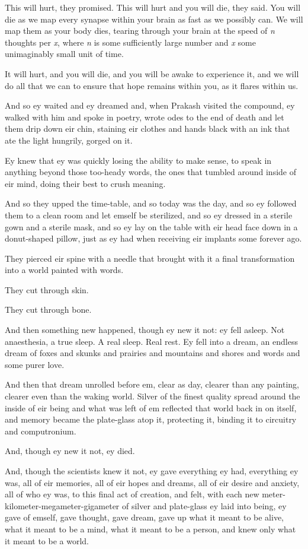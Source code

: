 This will hurt, they promised. This will hurt and you will die, they said. You will die as we map every synapse within your brain as fast as we possibly can. We will map them as your body dies, tearing through your brain at the speed of \emph{n} thoughts per \emph{x}, where \emph{n} is some sufficiently large number and \emph{x} some unimaginably small unit of time.

It will hurt, and you will die, and you will be awake to experience it, and we will do all that we can to ensure that hope remains within you, as it flares within us.

And so ey waited and ey dreamed and, when Prakash visited the compound, ey walked with him and spoke in poetry, wrote odes to the end of death and let them drip down eir chin, staining eir clothes and hands black with an ink that ate the light hungrily, gorged on it.

Ey knew that ey was quickly losing the ability to make sense, to speak in anything beyond those too-heady words, the ones that tumbled around inside of eir mind, doing their best to crush meaning.

And so they upped the time-table, and so today was the day, and so ey followed them to a clean room and let emself be sterilized, and so ey dressed in a sterile gown and a sterile mask, and so ey lay on the table with eir head face down in a donut-shaped pillow, just as ey had when receiving eir implants some forever ago.

They pierced eir spine with a needle that brought with it a final transformation into a world painted with words.

They cut through skin.

They cut through bone.

And then something new happened, though ey new it not: ey fell asleep. Not anaesthesia, a true sleep. A real sleep. Real rest. Ey fell into a dream, an endless dream of foxes and skunks and prairies and mountains and shores and words and some purer love.

And then that dream unrolled before em, clear as day, clearer than any painting, clearer even than the waking world. Silver of the finest quality spread around the inside of eir being and what was left of em reflected that world back in on itself, and memory became the plate-glass atop it, protecting it, binding it to circuitry and computronium.

And, though ey new it not, ey died.

And, though the scientists knew it not, ey gave everything ey had, everything ey was, all of eir memories, all of eir hopes and dreams, all of eir desire and anxiety, all of who ey was, to this final act of creation, and felt, with each new meter-kilometer-megameter-gigameter of silver and plate-glass ey laid into being, ey gave of emself, gave thought, gave dream, gave up what it meant to be alive, what it meant to be a mind, what it meant to be a person, and knew only what it meant to be a world.

